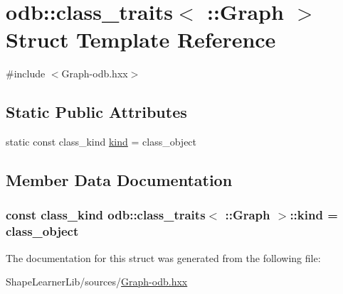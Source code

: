 \hypertarget{structodb_1_1class__traits_3_01_1_1_graph_01_4}{}\section{odb\+:\+:class\+\_\+traits$<$ \+:\+:Graph $>$ Struct Template Reference}
\label{structodb_1_1class__traits_3_01_1_1_graph_01_4}


{\ttfamily \#include $<$Graph-\/odb.\+hxx$>$}

\subsection*{Static Public Attributes}
\begin{DoxyCompactItemize}
\item 
static const class\+\_\+kind \hyperlink{structodb_1_1class__traits_3_01_1_1_graph_01_4_a0debb2b8e06b1807fac808c9d1526ea6}{kind} = class\+\_\+object
\end{DoxyCompactItemize}


\subsection{Member Data Documentation}
\hypertarget{structodb_1_1class__traits_3_01_1_1_graph_01_4_a0debb2b8e06b1807fac808c9d1526ea6}{}
\subsubsection[{kind}]{\setlength{\rightskip}{0pt plus 5cm}const class\+\_\+kind odb\+::class\+\_\+traits$<$ \+::{\bf Graph} $>$\+::kind = class\+\_\+object\hspace{0.3cm}{\ttfamily [static]}}\label{structodb_1_1class__traits_3_01_1_1_graph_01_4_a0debb2b8e06b1807fac808c9d1526ea6}


The documentation for this struct was generated from the following file\+:\begin{DoxyCompactItemize}
\item 
Shape\+Learner\+Lib/sources/\hyperlink{_graph-odb_8hxx}{Graph-\/odb.\+hxx}\end{DoxyCompactItemize}
